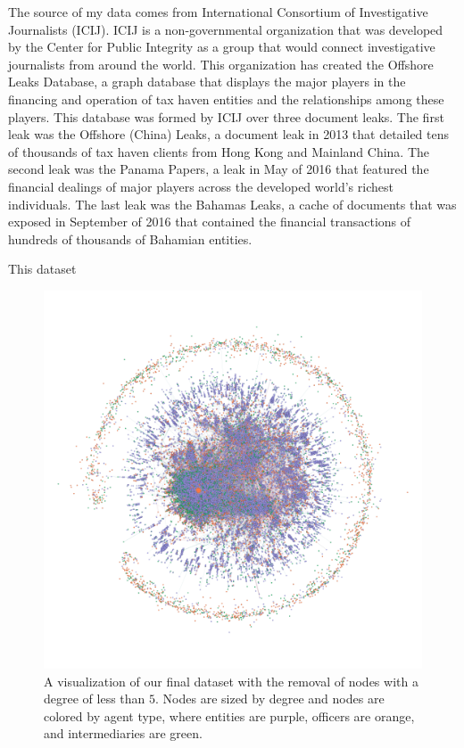 \documentclass[11pt]{article}
\begin{document}
The source of my data comes from International Consortium of Investigative
Journalists (ICIJ). ICIJ is a non-governmental organization that was developed
by the Center for Public Integrity as a group that would connect investigative
journalists from around the world. This organization has created the Offshore
Leaks Database, a graph database that displays the major players in the
financing and operation of tax haven entities and the relationships among these
players. This database was formed by ICIJ over three document leaks. The first
leak was the Offshore (China) Leaks, a document leak in 2013
that detailed tens of thousands of tax haven clients from Hong Kong and 
Mainland China. The second leak was the Panama Papers, a leak in May of 2016
that featured the financial dealings of major players across the developed
world's richest individuals. The last leak was the Bahamas Leaks, a cache of
documents that was exposed in September of 2016 that contained the financial
transactions of hundreds of thousands of Bahamian entities.

This dataset
\begin{figure}[h!]
    \centering
    \includegraphics[width = 5in]{figures/figure1.png}
    \caption{A visualization of our final dataset with the removal of
            nodes with a degree of less than $5.$ Nodes are sized by
            degree and nodes are colored by agent type, where entities are
            purple, officers are orange, and intermediaries are green.}
\end{figure}
\end{document}
